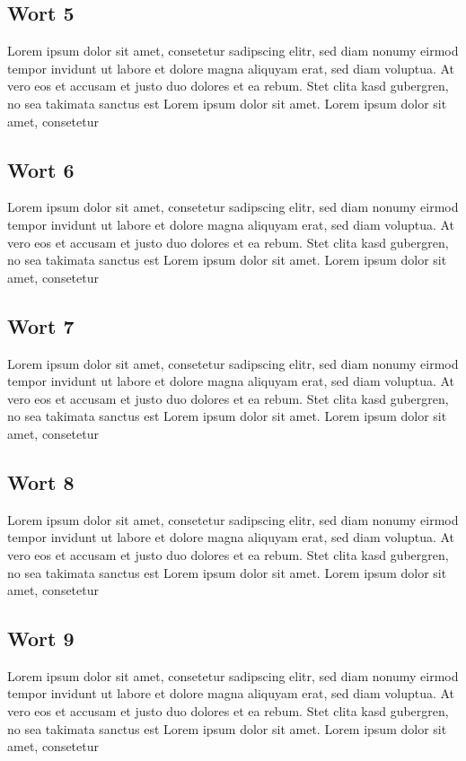 \documentclass[10pt,a4paper]{article} %
\begin{document}
\begin{multicols}{2}
\subsection*{Wort 5}
Lorem ipsum dolor sit amet, consetetur sadipscing elitr, sed diam nonumy eirmod tempor invidunt ut labore et dolore magna aliquyam erat, sed diam voluptua. At vero eos et accusam et justo duo dolores et ea rebum. Stet clita kasd gubergren, no sea takimata sanctus est Lorem ipsum dolor sit amet. Lorem ipsum dolor sit amet, consetetur 

\subsection*{Wort 6}
Lorem ipsum dolor sit amet, consetetur sadipscing elitr, sed diam nonumy eirmod tempor invidunt ut labore et dolore magna aliquyam erat, sed diam voluptua. At vero eos et accusam et justo duo dolores et ea rebum. Stet clita kasd gubergren, no sea takimata sanctus est Lorem ipsum dolor sit amet. Lorem ipsum dolor sit amet, consetetur 

\subsection*{Wort 7}
Lorem ipsum dolor sit amet, consetetur sadipscing elitr, sed diam nonumy eirmod tempor invidunt ut labore et dolore magna aliquyam erat, sed diam voluptua. At vero eos et accusam et justo duo dolores et ea rebum. Stet clita kasd gubergren, no sea takimata sanctus est Lorem ipsum dolor sit amet. Lorem ipsum dolor sit amet, consetetur 

\subsection*{Wort 8}
Lorem ipsum dolor sit amet, consetetur sadipscing elitr, sed diam nonumy eirmod tempor invidunt ut labore et dolore magna aliquyam erat, sed diam voluptua. At vero eos et accusam et justo duo dolores et ea rebum. Stet clita kasd gubergren, no sea takimata sanctus est Lorem ipsum dolor sit amet. Lorem ipsum dolor sit amet, consetetur 

\subsection*{Wort 9}
Lorem ipsum dolor sit amet, consetetur sadipscing elitr, sed diam nonumy eirmod tempor invidunt ut labore et dolore magna aliquyam erat, sed diam voluptua. At vero eos et accusam et justo duo dolores et ea rebum. Stet clita kasd gubergren, no sea takimata sanctus est Lorem ipsum dolor sit amet. Lorem ipsum dolor sit amet, consetetur 



\end{multicols}
\end{document}
